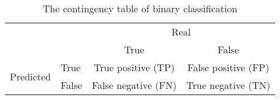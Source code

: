 \begin{table}[h]
\centering
\caption{The contingency table of binary classification}
\label{tab:f1}
\begin{tabular}{ll|c|c|}
\hline
\multicolumn{2}{|l|}{\multirow{2}{*}{}}                        & \multicolumn{2}{c|}{Real}           \\ \cline{3-4} 
\multicolumn{2}{|l|}{}                                         & True                & False               \\ \hline
\multicolumn{1}{|c|}{\multirow{2}{*}{Predicted}} & True  & True positive (TP)  & False positive (FP) \\ \cline{2-4} 
\multicolumn{1}{|c|}{}                                 & False & False negative (FN) & True negative (TN)  \\ \hline
\end{tabular}
\end{table}